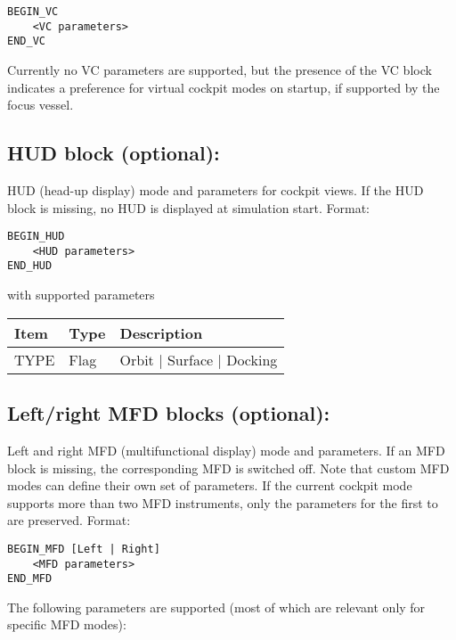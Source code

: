 \documentclass[Orbiter Developer Manual.tex]{subfiles}
\begin{document}
\begin{lstlisting}[language=OSFS]
BEGIN_VC
	<VC parameters>
END_VC
\end{lstlisting}

\noindent
Currently no VC parameters are supported, but the presence of the VC block indicates a preference for virtual cockpit modes on startup, if supported by the focus vessel.


\subsection*{HUD block (optional):}
HUD (head-up display) mode and parameters for cockpit views. If the HUD block is missing, no HUD is displayed at simulation start. Format:

\begin{lstlisting}[language=OSFS]
BEGIN_HUD
	<HUD parameters>
END_HUD
\end{lstlisting}

\noindent
with supported parameters

\begin{table}[H]
	\centering
	\begin{tabularx}{\textwidth}{ |l|l|X| }
	\hline\rule{0pt}{2ex}
	\textbf{Item} & \textbf{Type} & \textbf{Description}\\
	\hline\rule{0pt}{2ex}
	TYPE & Flag & Orbit | Surface | Docking\\
	\hline
	\end{tabularx}
\end{table}

\subsection*{Left/right MFD blocks (optional):}
Left and right MFD (multifunctional display) mode and parameters. If an MFD block is missing, the corresponding MFD is switched off. Note that custom MFD modes can define their own set of parameters. If the current cockpit mode supports more than two MFD instruments, only the parameters for the first to are preserved. Format:

\begin{lstlisting}[language=OSFS]
BEGIN_MFD [Left | Right]
	<MFD parameters>
END_MFD
\end{lstlisting}

\noindent
The following parameters are supported (most of which are relevant only for specific MFD modes):
\end{document}
